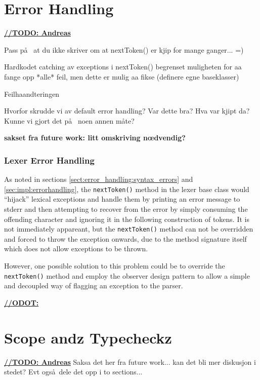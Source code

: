 


\section{Error Handling}
\underline{\textbf{\LARGE //TODO: Andreas}}

Pass p\aa~ at du ikke skriver om at nextToken() er kjip for mange ganger... =)

Hardkodet catching av exceptions i nextToken() begrenset muligheten for aa
fange opp *alle* feil, men dette er mulig aa fikse (definere egne baseklasser)

Feilhaandteringen

Hvorfor skrudde vi av default error handling? Var dette bra? Hva var kjipt da? Kunne vi gjort det p\aa~ noen annen m\aa te?


\textbf{sakset fra future work: litt omskriving n\oe dvendig?}
\subsubsection{Lexer Error Handling}
\label{sect:future_work:lexer_error_handling}
As noted in sections \ref{sect:error_handling:syntax_errors} and
\ref{sec:impl:errorhandling}, the \verb!nextToken()! method in the lexer base class
would ``hijack'' lexical exceptions and handle them by printing an error message
to stderr and then attempting to recover from the error by simply consuming the
offending character and ignoring it in the following construction of tokens. It is 
not immediately appareant, but the \verb!nextToken()! method can not be overridden and
forced to throw the exception onwards, due to the method signature itself which
does not allow exceptions to be thrown. 

However, one possible solution to this problem could be to override the \verb!nextToken()! method and employ the observer design pattern to allow a simple and decoupled way of flagging an exception to the parser.



\underline{\textbf{\LARGE //ODOT:}}


\section{Scope andz Typecheckz}

\underline{\textbf{\LARGE //TODO: Andreas}} Saksa det her fra future work... kan det bli mer diskusjon i stedet? Evt ogs\aa~dele det opp i to sections...

